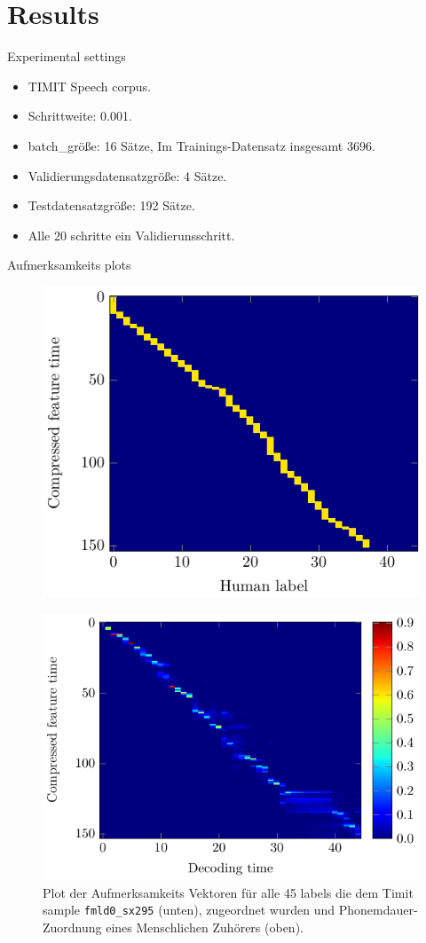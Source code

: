 \documentclass[10pt]{beamer}
\begin{document}
\section{Results}

\begin{frame}{Experimental settings}

\begin{itemize}
	\item TIMIT Speech corpus.
	\item Schrittweite: 0.001.
	\item batch\_größe: 16 Sätze, Im Trainings-Datensatz insgesamt 3696.
	\item Validierungsdatensatzgröße: 4 Sätze.
	\item Testdatensatzgröße: 192 Sätze.
	\item Alle 20 schritte ein Validierunsschritt.
\end{itemize}

\end{frame}

\begin{frame}{Aufmerksamkeits plots}
	\begin{figure}
	\centering
	\includegraphics[width=0.2\linewidth, angle=90]{../tikz/align}
	\end{figure}
	\begin{figure}
	\centering
	\includegraphics[width=0.2\linewidth, angle=90]{../tikz/alpha}
	\caption{Plot der Aufmerksamkeits Vektoren für alle 45 labels die dem
	Timit sample \texttt{fmld0\_sx295} (unten), zugeordnet wurden und
	Phonemdauer-Zuordnung eines Menschlichen Zuhörers (oben).}
	\label{fig:fullAttention}
	\end{figure}
\end{frame}
\end{document}
